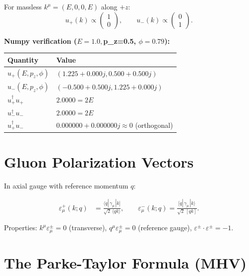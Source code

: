 \documentclass[12pt]{article}
\begin{document}
For massless $k^\mu=(E,0,0,E)$ along $+z$:
\begin{equation}
u_+(k)\propto\begin{pmatrix}1\\0\end{pmatrix},
\qquad
u_-(k)\propto\begin{pmatrix}0\\1\end{pmatrix} .
\end{equation}

\textbf{Numpy verification ($E=1.0, $p_z=0.5, $\phi=0.79$):}
\begin{center}
\begin{tabular}{|l|l|}
\hline
Quantity & Value \\
\hline
$u_+(E,p_z,\phi)$ & $(1.225+0.000j, 0.500+0.500j)$ \\
$u_-(E,p_z,\phi)$ & $(-0.500+0.500j, 1.225+0.000j)$ \\
$u_+^\dagger u_+$ & $2.0000 = 2E$ \\
$u_-^\dagger u_-$ & $2.0000 = 2E$ \\
$u_+^\dagger u_-$ & $0.000000+0.000000j \approx 0$ (orthogonal) \\
\hline
\end{tabular}
\end{center}

\section{Gluon Polarization Vectors}\label{sec:polarization}

In axial gauge with reference momentum $q$:

\begin{mdframed}
\begin{align}
\varepsilon^+_\mu(k;q)
&= \frac{\langle q|\,\gamma_\mu\,|k]}{\sqrt2\,\langle qk\rangle},
\qquad
\varepsilon^-_\mu(k;q)
= \frac{[q|\,\gamma_\mu\,|k\rangle}{\sqrt2\,[qk]} .
\tag{48.$\star$}
\end{align}
\end{mdframed}

Properties: $k^\mu\varepsilon_\mu^\pm=0$ (transverse),
$q^\mu\varepsilon_\mu^\pm=0$ (reference gauge),
$\varepsilon^\pm\cdot\varepsilon^\pm=-1$.

\section{The Parke-Taylor Formula (MHV)}\label{sec:mhv}
\end{document}
